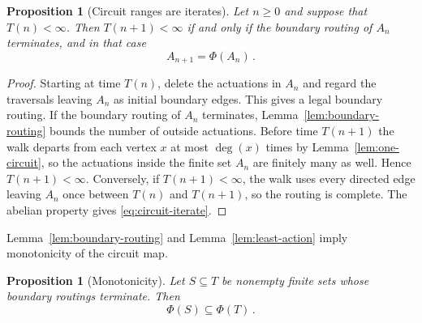 \documentclass[11pt]{amsart}
\theoremstyle{plain}
\newtheorem{proposition}[theorem]{Proposition}
\theoremstyle{definition}
\begin{document}
	\begin{proposition}[Circuit ranges are iterates]
		\label{prop:circuit-iterate}
		Let $n\geq0$ and suppose that $T(n)<\infty$.  Then $T(n+1)<\infty$ if and
		only if the boundary routing of $A_n$ terminates,
		and in that case
		\begin{equation}\label{eq:circuit-iterate}
			A_{n+1}=\Phi(A_n)\, .
		\end{equation}
	\end{proposition}
	
	\begin{proof}
		Starting at time $T(n)$, delete the actuations in $A_n$ and regard the
		traversals leaving $A_n$ as initial boundary edges.  This gives a legal
		boundary routing.
		If the boundary routing of $A_n$ terminates,
		Lemma~\ref{lem:boundary-routing} bounds the number of outside actuations.
		Before time $T(n+1)$ the walk departs from
		each vertex $x$ at most $\deg(x)$ times by Lemma~\ref{lem:one-circuit}, so the
		actuations inside the finite set $A_n$ are finitely many as well.  Hence
		$T(n+1)<\infty$.  Conversely, if $T(n+1)<\infty$, the walk uses every
		directed edge leaving $A_n$ once between $T(n)$ and $T(n+1)$, so the routing
		is complete.  The abelian property gives
		\eqref{eq:circuit-iterate}.
	\end{proof}
	
	Lemma~\ref{lem:boundary-routing} and Lemma~\ref{lem:least-action} imply monotonicity 
	of the circuit map. 
	\begin{proposition}[Monotonicity]\label{prop:monotonicity}
		Let $S\subseteq T$ be nonempty finite sets whose boundary routings
		terminate.  Then
		\begin{equation}\label{eq:monotonicity}
			\Phi(S)\subseteq\Phi(T)\, .
		\end{equation}
	\end{proposition}
	
	
\end{document}
